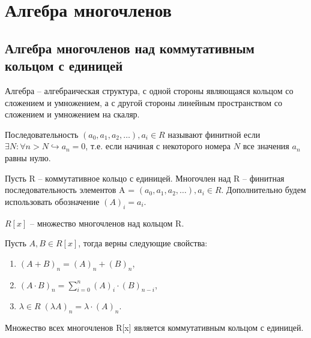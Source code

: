
\section{Алгебра многочленов}
\subsection{Алгебра многочленов над коммутативным кольцом с единицей}

\begin{reminder}
    Алгебра -- алгебраическая структура, с одной стороны являющаяся кольцом со сложением и умножением, 
    а с другой стороны линейным пространством со сложением и умножением на скаляр.
\end{reminder}

\begin{definition}
    Последовательность $(a_0, a_1, a_2,\dots), a_i \in R$ называют финитной если 
    $\exists N : \forall n>N \hookrightarrow a_n = 0$, т.е. если начиная с некоторого номера $N$ все 
    значения $a_n$ равны нулю.
\end{definition}

\begin{definition}
    Пусть R -- коммутативное кольцо с единицей. Многочлен над R -- финитная последовательность элементов 
    A = $(a_0, a_1, a_2,\dots), a_i \in R$. Дополнительно будем использовать обозначение $(A)_i = a_i$.
\end{definition}

\begin{definition}
$R[x]$ -- множество многочленов над кольцом R.
\end{definition}

\begin{definition}
Пусть $A, B \in R[x]$, тогда верны следующие свойства:
\begin{enumerate}
    \item $(A + B)_n = (A)_n + (B)_n$,
    \item $(A \cdot B)_n = \displaystyle\sum_{i = 0}^{n}(A)_i \cdot (B)_{n-i}$,
    \item $\lambda \in R \; (\lambda A)_n = \lambda \cdot (A)_n$.
\end{enumerate}
\end{definition}

\begin{proposition}
    Множество всех многочленов R[x] является коммутативным кольцом с единицей.
\end{proposition}

